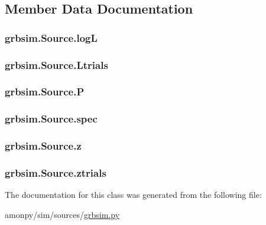 \subsection{Member Data Documentation}
\hypertarget{classgrbsim_1_1_source_a1c36aeb1b0caa2b1c72b1d9536e04999}{
\subsubsection[{log\-L}]{\setlength{\rightskip}{0pt plus 5cm}grbsim.\-Source.\-log\-L}}\label{classgrbsim_1_1_source_a1c36aeb1b0caa2b1c72b1d9536e04999}
\hypertarget{classgrbsim_1_1_source_a80a43f13cc9341bb425fc1e29c799a79}{
\subsubsection[{Ltrials}]{\setlength{\rightskip}{0pt plus 5cm}grbsim.\-Source.\-Ltrials}}\label{classgrbsim_1_1_source_a80a43f13cc9341bb425fc1e29c799a79}
\hypertarget{classgrbsim_1_1_source_a40756599695386befd7d94dea7c45c67}{
\subsubsection[{P}]{\setlength{\rightskip}{0pt plus 5cm}grbsim.\-Source.\-P}}\label{classgrbsim_1_1_source_a40756599695386befd7d94dea7c45c67}
\hypertarget{classgrbsim_1_1_source_aa8feb6cf28391b9206c57f0b5ea1dd2a}{
\subsubsection[{spec}]{\setlength{\rightskip}{0pt plus 5cm}grbsim.\-Source.\-spec}}\label{classgrbsim_1_1_source_aa8feb6cf28391b9206c57f0b5ea1dd2a}
\hypertarget{classgrbsim_1_1_source_aa983a728c20508521a6e442d8692802a}{
\subsubsection[{z}]{\setlength{\rightskip}{0pt plus 5cm}grbsim.\-Source.\-z}}\label{classgrbsim_1_1_source_aa983a728c20508521a6e442d8692802a}
\hypertarget{classgrbsim_1_1_source_a49ad1adc6c791d565301090c86734bd3}{
\subsubsection[{ztrials}]{\setlength{\rightskip}{0pt plus 5cm}grbsim.\-Source.\-ztrials}}\label{classgrbsim_1_1_source_a49ad1adc6c791d565301090c86734bd3}


The documentation for this class was generated from the following file\-:\begin{DoxyCompactItemize}
\item 
amonpy/sim/sources/\hyperlink{grbsim_8py}{grbsim.\-py}\end{DoxyCompactItemize}
